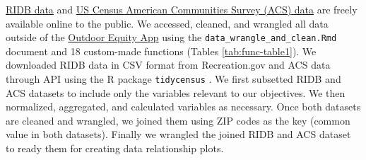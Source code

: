 \documentclass[
  11 pt,
  openany]{book}
\begin{document}
\href{https://ridb.recreation.gov/}{RIDB data} and \href{https://www.census.gov/programs-surveys/acs/data.html}{US Census American Communities Survey (ACS) data} are freely available online to the public. We accessed, cleaned, and wrangled all data outside of the \href{https://shinyapps.bren.ucsb.edu/oe_app/}{Outdoor Equity App} using the \texttt{data\_wrangle\_and\_clean.Rmd} document and 18 custom-made functions (Tables \ref{tab:func-table1}). We downloaded RIDB data in CSV format from Recreation.gov and ACS data through API using the R package \texttt{tidycensus} \citep{R-tidycensus}. We first subsetted RIDB and ACS datasets to include only the variables relevant to our objectives. We then normalized, aggregated, and calculated variables as necessary. Once both datasets are cleaned and wrangled, we joined them using ZIP codes as the key (common value in both datasets). Finally we wrangled the joined RIDB and ACS dataset to ready them for creating data relationship plots.
\end{document}
